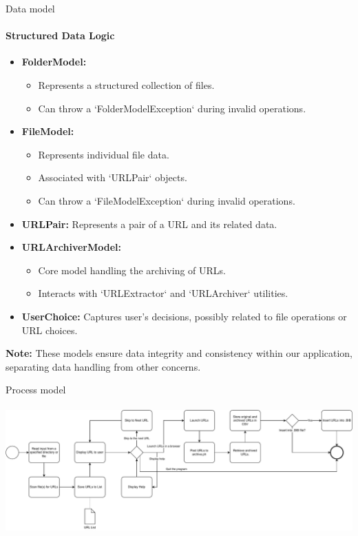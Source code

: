 \documentclass[
    ngerman,%
    authorontitle=true,
]{bfhbeamer}
\begin{document}
    \begin{frame}{Data model}
        \framesubtitle{Structured Data Logic}
        \begin{itemize}
            \item \textbf{FolderModel:}
            \begin{itemize}
                \item Represents a structured collection of files.
                \item Can throw a `FolderModelException` during invalid operations.
            \end{itemize}

            \item \textbf{FileModel:}
            \begin{itemize}
                \item Represents individual file data.
                \item Associated with `URLPair` objects.
                \item Can throw a `FileModelException` during invalid operations.
            \end{itemize}

            \item \textbf{URLPair:} Represents a pair of a URL and its related data.

            \item \textbf{URLArchiverModel:}
            \begin{itemize}
                \item Core model handling the archiving of URLs.
                \item Interacts with `URLExtractor` and `URLArchiver` utilities.
            \end{itemize}

            \item \textbf{UserChoice:} Captures user's decisions, possibly related to file operations or URL choices.

        \end{itemize}

        \textbf{Note:} These models ensure data integrity and consistency within our application, separating data handling from other concerns.

    \end{frame}

    \begin{frame}{Process model}
        \framesubtitle{}
        \includegraphics[width=1\textwidth]{pictures/process_model-detailed_curved.pdf}
    \end{frame}
\end{document}
